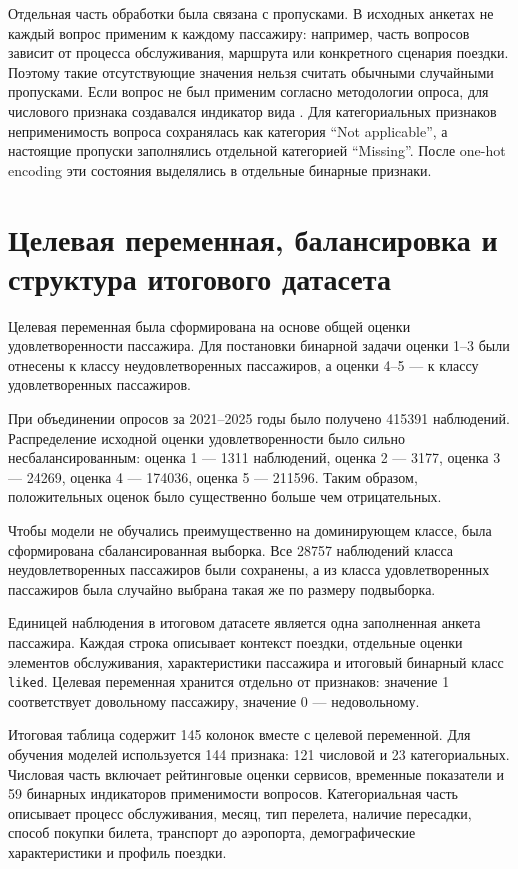 \documentclass[14pt,a4paper]{extreport}
\begin{document}
Отдельная часть обработки была связана с пропусками. В исходных анкетах не каждый вопрос применим к каждому пассажиру: например, часть вопросов зависит от процесса обслуживания, маршрута или конкретного сценария поездки. Поэтому такие отсутствующие значения нельзя считать обычными случайными пропусками. Если вопрос не был применим согласно методологии опроса, для числового признака создавался индикатор вида . Для категориальных признаков неприменимость вопроса сохранялась как категория ``Not applicable'', а настоящие пропуски заполнялись отдельной категорией ``Missing''. После one-hot encoding эти состояния выделялись в отдельные бинарные признаки.

\section{Целевая переменная, балансировка и структура итогового датасета}
Целевая переменная была сформирована на основе общей оценки удовлетворенности пассажира. Для постановки бинарной задачи оценки 1--3 были отнесены к классу неудовлетворенных пассажиров, а оценки 4--5 --- к классу удовлетворенных пассажиров.

При объединении опросов за 2021--2025 годы было получено 415391 наблюдений. Распределение исходной оценки удовлетворенности было сильно несбалансированным: оценка 1 --- 1311 наблюдений, оценка 2 --- 3177, оценка 3 --- 24269, оценка 4 --- 174036, оценка 5 --- 211596. Таким образом, положительных оценок было существенно больше чем отрицательных.

Чтобы модели не обучались преимущественно на доминирующем классе, была сформирована сбалансированная выборка. Все 28757 наблюдений класса неудовлетворенных пассажиров были сохранены, а из класса удовлетворенных пассажиров была случайно выбрана такая же по размеру подвыборка.

Единицей наблюдения в итоговом датасете является одна заполненная анкета пассажира. Каждая строка описывает контекст поездки, отдельные оценки элементов обслуживания, характеристики пассажира и итоговый бинарный класс \texttt{liked}. Целевая переменная хранится отдельно от признаков: значение 1 соответствует довольному пассажиру, значение 0 --- недовольному.

Итоговая таблица содержит 145 колонок вместе с целевой переменной. Для обучения моделей используется 144 признака: 121 числовой и 23 категориальных. Числовая часть включает рейтинговые оценки сервисов, временные показатели и 59 бинарных индикаторов применимости вопросов. Категориальная часть описывает процесс обслуживания, месяц, тип перелета, наличие пересадки, способ покупки билета, транспорт до аэропорта, демографические характеристики и профиль поездки.
\end{document}
